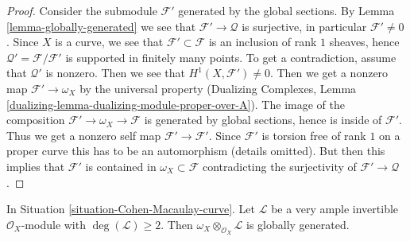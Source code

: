 \begin{proof}
Consider the submodule $\mathcal{F}'$ generated by the global sections. By
Lemma \ref{lemma-globally-generated} we see that $\mathcal{F}' \to \mathcal{Q}$
is surjective, in particular $\mathcal{F}' \not = 0$. Since $X$ is a curve, we
see that $\mathcal{F}' \subset \mathcal{F}$ is an inclusion of rank $1$
sheaves, hence $\mathcal{Q}' = \mathcal{F}/\mathcal{F}'$ is supported in
finitely many points. To get a contradiction, assume that
$\mathcal{Q}'$ is nonzero. Then we see that $H^1(X, \mathcal{F}') \not = 0$.
Then we get a nonzero map $\mathcal{F}' \to \omega_X$ by the universal
property (Dualizing Complexes, Lemma
\ref{dualizing-lemma-dualizing-module-proper-over-A}).
The image of the composition $\mathcal{F}' \to \omega_X \to \mathcal{F}$
is generated by global sections, hence is inside of $\mathcal{F}'$.
Thus we get a nonzero self map $\mathcal{F}' \to \mathcal{F}'$.
Since $\mathcal{F}'$ is torsion free of rank $1$ on a proper curve
this has to be an automorphism (details omitted). But then this implies that
$\mathcal{F}'$ is contained in $\omega_X \subset \mathcal{F}$
contradicting the surjectivity of $\mathcal{F}' \to \mathcal{Q}$.
\end{proof}

\begin{lemma}
\label{lemma-tensor-omega-with-globally-generated-invertible}
In Situation \ref{situation-Cohen-Macaulay-curve}. Let $\mathcal{L}$
be a very ample invertible $\mathcal{O}_X$-module with
$\deg(\mathcal{L}) \geq 2$. Then
$\omega_X \otimes_{\mathcal{O}_X} \mathcal{L}$ is globally generated.
\end{lemma}

